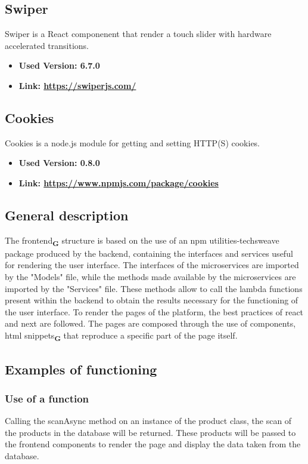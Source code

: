 \subsection{Swiper}
Swiper is a React componenent that render a touch slider with hardware accelerated transitions.
\begin{itemize}
  \item \textbf{Used Version: 6.7.0}
  \item \textbf{Link: \url{https://swiperjs.com/}}
\end{itemize}
\subsection{Cookies}
Cookies is a node.js module for getting and setting HTTP(S) cookies.
\begin{itemize}
  \item \textbf{Used Version: 0.8.0}
  \item \textbf{Link: \url{https://www.npmjs.com/package/cookies}}
\end{itemize}
\subsection{General description}
The frontend\textsubscript{\textbf{G}} structure is based on the use of an npm utilities-techsweave package produced by the backend, containing the interfaces and services useful for rendering the user interface. The interfaces of the microservices are imported by the "Models" file, while the methods made available by the microservices are imported by the "Services" file. These methods allow to call the lambda functions present within the backend to obtain the results necessary for the functioning of the user interface. To render the pages of the platform, the best practices of react and next are followed. The pages are composed through the use of components, html snippets\textsubscript{\textbf{G}} that reproduce a specific part of the page itself.
\subsection{Examples of functioning}
\subsubsection{Use of a function}
Calling the scanAsync method on an instance of the product class, the scan of the products in the database will be returned. These products will be passed to the frontend components to render the page and display the data taken from the database.
